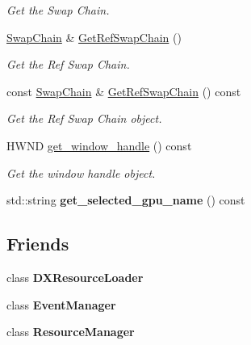 \begin{DoxyCompactItemize}
\begin{DoxyCompactList}\small\item\em Get the Swap Chain. \end{DoxyCompactList}\item 
\hyperlink{structSwapChain}{Swap\+Chain} \& \hyperlink{classDXRenderer_ab75c4ead239b0c31ff8b0b6d826d35af}{Get\+Ref\+Swap\+Chain} ()
\begin{DoxyCompactList}\small\item\em Get the Ref Swap Chain. \end{DoxyCompactList}\item 
const \hyperlink{structSwapChain}{Swap\+Chain} \& \hyperlink{classDXRenderer_a28d203f9cd99268797fbd869f996e1a8}{Get\+Ref\+Swap\+Chain} () const
\begin{DoxyCompactList}\small\item\em Get the Ref Swap Chain object. \end{DoxyCompactList}\item 
H\+W\+ND \hyperlink{classDXRenderer_a42ba6c03505ed59104538abfcd554d15}{get\+\_\+window\+\_\+handle} () const
\begin{DoxyCompactList}\small\item\em Get the window handle object. \end{DoxyCompactList}\item 
\mbox{\label{classDXRenderer_ad11199cdf6b72ffdcaff80e92e88d128}} 
std\+::string {\bfseries get\+\_\+selected\+\_\+gpu\+\_\+name} () const
\end{DoxyCompactItemize}
\subsection*{Friends}
\begin{DoxyCompactItemize}
\item 
\mbox{\label{classDXRenderer_a871268c492209c5a9db9dc2db99f4d04}} 
class {\bfseries D\+X\+Resource\+Loader}
\item 
\mbox{\label{classDXRenderer_aba45a46c615e2683daffdae82e2d3b8f}} 
class {\bfseries Event\+Manager}
\item 
\mbox{\label{classDXRenderer_a54c1252abc87a78a301e6b6984470408}} 
class {\bfseries Resource\+Manager}
\end{DoxyCompactItemize}


